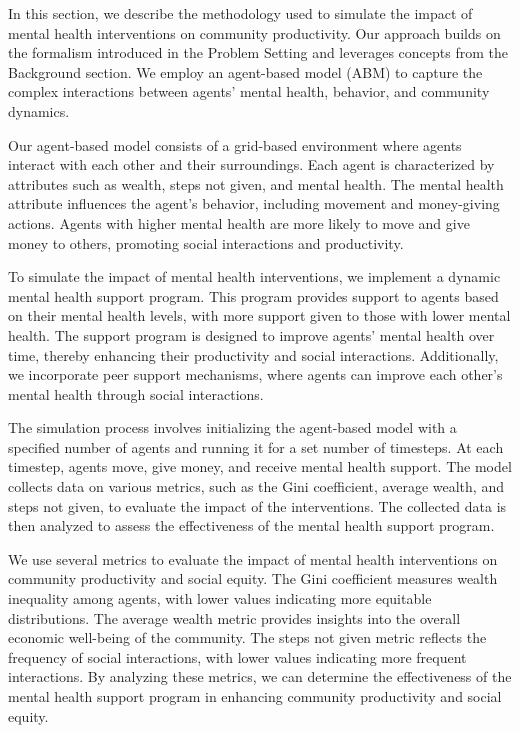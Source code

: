 \documentclass{article} %
\begin{document}
In this section, we describe the methodology used to simulate the impact of mental health interventions on community productivity. Our approach builds on the formalism introduced in the Problem Setting and leverages concepts from the Background section. We employ an agent-based model (ABM) to capture the complex interactions between agents' mental health, behavior, and community dynamics.

Our agent-based model consists of a grid-based environment where agents interact with each other and their surroundings. Each agent is characterized by attributes such as wealth, steps not given, and mental health. The mental health attribute influences the agent's behavior, including movement and money-giving actions. Agents with higher mental health are more likely to move and give money to others, promoting social interactions and productivity.

To simulate the impact of mental health interventions, we implement a dynamic mental health support program. This program provides support to agents based on their mental health levels, with more support given to those with lower mental health. The support program is designed to improve agents' mental health over time, thereby enhancing their productivity and social interactions. Additionally, we incorporate peer support mechanisms, where agents can improve each other's mental health through social interactions.

The simulation process involves initializing the agent-based model with a specified number of agents and running it for a set number of timesteps. At each timestep, agents move, give money, and receive mental health support. The model collects data on various metrics, such as the Gini coefficient, average wealth, and steps not given, to evaluate the impact of the interventions. The collected data is then analyzed to assess the effectiveness of the mental health support program.

We use several metrics to evaluate the impact of mental health interventions on community productivity and social equity. The Gini coefficient measures wealth inequality among agents, with lower values indicating more equitable distributions. The average wealth metric provides insights into the overall economic well-being of the community. The steps not given metric reflects the frequency of social interactions, with lower values indicating more frequent interactions. By analyzing these metrics, we can determine the effectiveness of the mental health support program in enhancing community productivity and social equity.
\end{document}
